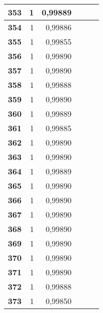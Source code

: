 {\begin{longtable}{|r|r|r|l|r|r|}
\textbf{353} & 1 & 0,99889 &  & \multicolumn{1}{l|}{} & \multicolumn{1}{l|}{} \\ \hline
\textbf{354} & 1 & 0,99886 &  & \multicolumn{1}{l|}{} & \multicolumn{1}{l|}{} \\ \hline
\textbf{355} & 1 & 0,99855 &  & \multicolumn{1}{l|}{} & \multicolumn{1}{l|}{} \\ \hline
\textbf{356} & 1 & 0,99890 &  & \multicolumn{1}{l|}{} & \multicolumn{1}{l|}{} \\ \hline
\textbf{357} & 1 & 0,99890 &  & \multicolumn{1}{l|}{} & \multicolumn{1}{l|}{} \\ \hline
\textbf{358} & 1 & 0,99888 &  & \multicolumn{1}{l|}{} & \multicolumn{1}{l|}{} \\ \hline
\textbf{359} & 1 & 0,99890 &  & \multicolumn{1}{l|}{} & \multicolumn{1}{l|}{} \\ \hline
\textbf{360} & 1 & 0,99889 &  & \multicolumn{1}{l|}{} & \multicolumn{1}{l|}{} \\ \hline
\textbf{361} & 1 & 0,99885 &  & \multicolumn{1}{l|}{} & \multicolumn{1}{l|}{} \\ \hline
\textbf{362} & 1 & 0,99890 &  & \multicolumn{1}{l|}{} & \multicolumn{1}{l|}{} \\ \hline
\textbf{363} & 1 & 0,99890 &  & \multicolumn{1}{l|}{} & \multicolumn{1}{l|}{} \\ \hline
\textbf{364} & 1 & 0,99889 &  & \multicolumn{1}{l|}{} & \multicolumn{1}{l|}{} \\ \hline
\textbf{365} & 1 & 0,99890 &  & \multicolumn{1}{l|}{} & \multicolumn{1}{l|}{} \\ \hline
\textbf{366} & 1 & 0,99890 &  & \multicolumn{1}{l|}{} & \multicolumn{1}{l|}{} \\ \hline
\textbf{367} & 1 & 0,99890 &  & \multicolumn{1}{l|}{} & \multicolumn{1}{l|}{} \\ \hline
\textbf{368} & 1 & 0,99890 &  & \multicolumn{1}{l|}{} & \multicolumn{1}{l|}{} \\ \hline
\textbf{369} & 1 & 0,99890 &  & \multicolumn{1}{l|}{} & \multicolumn{1}{l|}{} \\ \hline
\textbf{370} & 1 & 0,99890 &  & \multicolumn{1}{l|}{} & \multicolumn{1}{l|}{} \\ \hline
\textbf{371} & 1 & 0,99890 &  & \multicolumn{1}{l|}{} & \multicolumn{1}{l|}{} \\ \hline
\textbf{372} & 1 & 0,99888 &  & \multicolumn{1}{l|}{} & \multicolumn{1}{l|}{} \\ \hline
\textbf{373} & 1 & 0,99850 &  & \multicolumn{1}{l|}{} & \multicolumn{1}{l|}{} \\ \hline

\end{longtable}}
